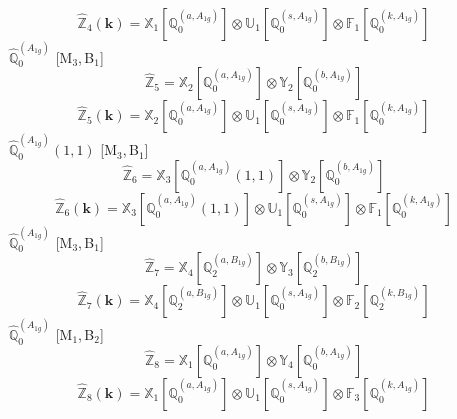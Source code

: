 \documentclass[fleqn,10pt,landscape]{article}
\begin{document}
\begin{itemize}
\begin{dmath*}
\hat{\mathbb{Z}}_{4}(\bm{k})=\mathbb{X}_{1}[\mathbb{Q}_{0}^{(a,A_{1g})}] \otimes\mathbb{U}_{1}[\mathbb{Q}_{0}^{(s,A_{1g})}] \otimes\mathbb{F}_{1}[\mathbb{Q}_{0}^{(k,A_{1g})}]
\end{dmath*}
\vspace{4mm}
\noindent {} $\,\,\,\hat{\mathbb{Q}}_{0}^{(A_{1g})}$ [M$_{3}$,\,B$_{1}$]
\begin{dmath*}
\hat{\mathbb{Z}}_{5}=\mathbb{X}_{2}[\mathbb{Q}_{0}^{(a,A_{1g})}] \otimes\mathbb{Y}_{2}[\mathbb{Q}_{0}^{(b,A_{1g})}]
\end{dmath*}
\begin{dmath*}
\hat{\mathbb{Z}}_{5}(\bm{k})=\mathbb{X}_{2}[\mathbb{Q}_{0}^{(a,A_{1g})}] \otimes\mathbb{U}_{1}[\mathbb{Q}_{0}^{(s,A_{1g})}] \otimes\mathbb{F}_{1}[\mathbb{Q}_{0}^{(k,A_{1g})}]
\end{dmath*}
\vspace{4mm}
\noindent {} $\,\,\,\hat{\mathbb{Q}}_{0}^{(A_{1g})}(1,1)$ [M$_{3}$,\,B$_{1}$]
\begin{dmath*}
\hat{\mathbb{Z}}_{6}=\mathbb{X}_{3}[\mathbb{Q}_{0}^{(a,A_{1g})}(1,1)] \otimes\mathbb{Y}_{2}[\mathbb{Q}_{0}^{(b,A_{1g})}]
\end{dmath*}
\begin{dmath*}
\hat{\mathbb{Z}}_{6}(\bm{k})=\mathbb{X}_{3}[\mathbb{Q}_{0}^{(a,A_{1g})}(1,1)] \otimes\mathbb{U}_{1}[\mathbb{Q}_{0}^{(s,A_{1g})}] \otimes\mathbb{F}_{1}[\mathbb{Q}_{0}^{(k,A_{1g})}]
\end{dmath*}
\vspace{4mm}
\noindent {} $\,\,\,\hat{\mathbb{Q}}_{0}^{(A_{1g})}$ [M$_{3}$,\,B$_{1}$]
\begin{dmath*}
\hat{\mathbb{Z}}_{7}=\mathbb{X}_{4}[\mathbb{Q}_{2}^{(a,B_{1g})}] \otimes\mathbb{Y}_{3}[\mathbb{Q}_{2}^{(b,B_{1g})}]
\end{dmath*}
\begin{dmath*}
\hat{\mathbb{Z}}_{7}(\bm{k})=\mathbb{X}_{4}[\mathbb{Q}_{2}^{(a,B_{1g})}] \otimes\mathbb{U}_{1}[\mathbb{Q}_{0}^{(s,A_{1g})}] \otimes\mathbb{F}_{2}[\mathbb{Q}_{2}^{(k,B_{1g})}]
\end{dmath*}
\vspace{4mm}
\noindent {} $\,\,\,\hat{\mathbb{Q}}_{0}^{(A_{1g})}$ [M$_{1}$,\,B$_{2}$]
\begin{dmath*}
\hat{\mathbb{Z}}_{8}=\mathbb{X}_{1}[\mathbb{Q}_{0}^{(a,A_{1g})}] \otimes\mathbb{Y}_{4}[\mathbb{Q}_{0}^{(b,A_{1g})}]
\end{dmath*}
\begin{dmath*}
\hat{\mathbb{Z}}_{8}(\bm{k})=\mathbb{X}_{1}[\mathbb{Q}_{0}^{(a,A_{1g})}] \otimes\mathbb{U}_{1}[\mathbb{Q}_{0}^{(s,A_{1g})}] \otimes\mathbb{F}_{3}[\mathbb{Q}_{0}^{(k,A_{1g})}]

\end{dmath*}
\end{itemize}
\end{document}
